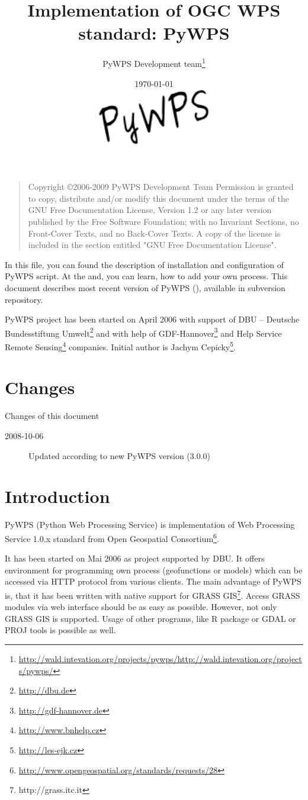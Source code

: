 \documentclass[a4paper,11pt]{report}
\author{PyWPS Development team\thanks{\url{http://wald.intevation.org/projects/pywps/http://wald.intevation.org/projects/pywps/}}}
\title{Implementation of OGC WPS standard: PyWPS}
\date{\today\\{}\vspace{2cm}\includegraphics[width=5cm]{pic/pywps.png}}
\begin{document}
\maketitle{}

\bigskip
\begin{quote}
    Copyright \copyright  2006-2009 PyWPS Development Team
    Permission is granted to copy, distribute and/or modify this document
    under the terms of the GNU Free Documentation License, Version 1.2
    or any later version published by the Free Software Foundation;
    with no Invariant Sections, no Front-Cover Texts, and no Back-Cover Texts.
    A copy of the license is included in the section entitled "GNU
    Free Documentation License".
\end{quote}
\bigskip


In this file, you can found the description of installation and
configuration of PyWPS script. At the and, you can learn, how to add
your own process. This document describes most recent
version of PyWPS (\version), available in subversion repository.

PyWPS project has been started on April 2006 with support of DBU --
Deutsche Bundesstiftung Umwelt\footnote{\url{http://dbu.de}} and with help of
GDF-Hannover\footnote{\url{http://gdf-hannover.de}} and Help Service Remote
Sensing\footnote{\url{http://www.bnhelp.cz}} companies. Initial author is Jachym
Cepicky\footnote{\url{http://les-ejk.cz}}.
    
\chapter{Changes}
Changes of this document
\begin{description}
    \item [2008-10-06] Updated according to new PyWPS version (3.0.0) \jachym
\end{description}

\tableofcontents

\newpage

\chapter{Introduction}
PyWPS (Python Web Processing Service) is implementation of Web
Processing Service 1.0.x standard from Open Geospatial
Consortium\footnote{\url{http://www.opengeospatial.org/standards/requests/28}}.

It has been started on Mai 2006 as project supported by DBU. It offers
environment for programming own process (geofunctions or models) which can
be accessed via HTTP protocol from various clients. The main advantage of PyWPS is, that it has
been written with native support for GRASS
GIS\footnote{http://grass.itc.it}. Access GRASS modules via web
interface should be as easy as possible.
However, not only GRASS GIS is supported. Usage of other programs, like
R package or GDAL or PROJ tools is possible as well.
\end{document}
